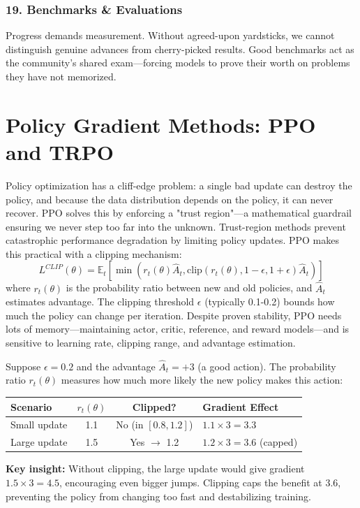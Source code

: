 \documentclass[12pt,a4paper]{report}
\theoremstyle{definition}
\begin{document}
\subsubsection*{19. Benchmarks \& Evaluations}
Progress demands measurement. Without agreed-upon yardsticks, we cannot distinguish genuine advances from cherry-picked results. Good benchmarks act as the community's shared exam---forcing models to prove their worth on problems they have not memorized.

\section{Policy Gradient Methods: PPO and TRPO}
Policy optimization has a cliff-edge problem: a single bad update can destroy the policy, and because the data distribution depends on the policy, it can never recover. PPO solves this by enforcing a "trust region"—a mathematical guardrail ensuring we never step too far into the unknown. Trust-region methods prevent catastrophic performance degradation by limiting policy updates. PPO \cite{schulman2017ppo} makes this practical with a clipping mechanism:
\begin{equation}
L^{CLIP}(\theta) = \mathbb{E}_t \left[ \min(r_t(\theta) \hat{A}_t, \text{clip}(r_t(\theta), 1-\epsilon, 1+\epsilon) \hat{A}_t) \right]
\end{equation}
where $r_t(\theta)$ is the probability ratio between new and old policies, and $\hat{A}_t$ estimates advantage. The clipping threshold $\epsilon$ (typically 0.1-0.2) bounds how much the policy can change per iteration. Despite proven stability, PPO needs lots of memory---maintaining actor, critic, reference, and reward models---and is sensitive to learning rate, clipping range, and advantage estimation.

\begin{tcolorbox}[colback=gray!5!white, colframe=gray!60!black, title=\textbf{Worked Example: PPO Clipping in Action}]
\small
Suppose $\epsilon = 0.2$ and the advantage $\hat{A}_t = +3$ (a good action). The probability ratio $r_t(\theta)$ measures how much more likely the new policy makes this action:

\begin{center}
\begin{tabular}{lccl}
\toprule
\textbf{Scenario} & $r_t(\theta)$ & \textbf{Clipped?} & \textbf{Gradient Effect} \\
\midrule
Small update & 1.1 & No (in $[0.8, 1.2]$) & $1.1 \times 3 = 3.3$ \\
Large update & 1.5 & Yes $\rightarrow$ 1.2 & $1.2 \times 3 = 3.6$ (capped) \\
\bottomrule
\end{tabular}
\end{center}

\textbf{Key insight:} Without clipping, the large update would give gradient $1.5 \times 3 = 4.5$, encouraging even bigger jumps. Clipping caps the benefit at $3.6$, preventing the policy from changing too fast and destabilizing training.
\end{tcolorbox}
\end{document}
